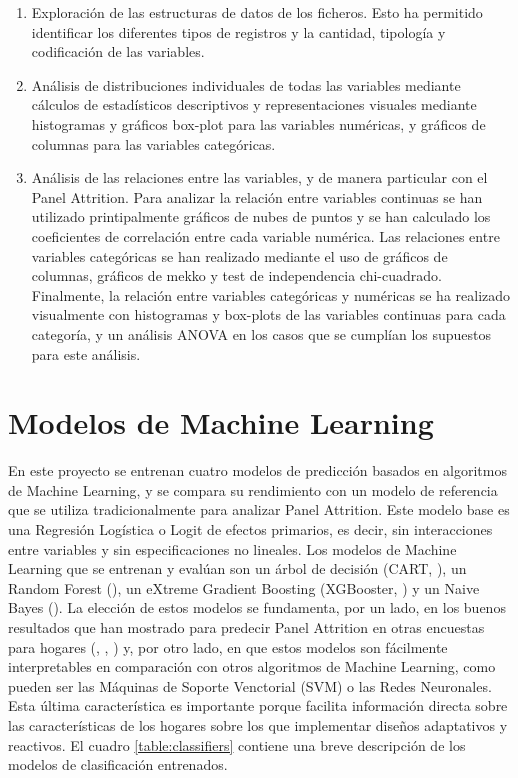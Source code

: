 \begin{enumerate}[noitemsep]
    \item Exploración de las estructuras de datos de los ficheros. Esto ha permitido identificar los diferentes tipos de registros y la cantidad, tipología y codificación de las variables.
    \item Análisis de distribuciones individuales de todas las variables mediante cálculos de estadísticos descriptivos y representaciones visuales mediante histogramas y gráficos box-plot para las variables numéricas, y gráficos de columnas para las variables categóricas.
    \item Análisis de las relaciones entre las variables, y de manera particular con el Panel Attrition. Para analizar la relación entre variables continuas se han utilizado printipalmente gráficos de nubes de puntos y se han calculado los coeficientes de correlación entre cada variable numérica. Las relaciones entre variables categóricas se han realizado mediante el uso de gráficos de columnas, gráficos de mekko y test de independencia chi-cuadrado. Finalmente, la relación entre variables categóricas y numéricas se ha realizado visualmente con histogramas y box-plots de las variables continuas para cada categoría, y un análisis ANOVA en los casos que se cumplían los supuestos para este análisis.
\end{enumerate}

\section{Modelos de Machine Learning}

En este proyecto se entrenan cuatro modelos de predicción basados en algoritmos de Machine Learning, y se compara su rendimiento con un modelo de referencia que se utiliza tradicionalmente para analizar Panel Attrition. Este modelo base es una Regresión Logística o Logit de efectos primarios, es decir, sin interacciones entre variables y sin especificaciones no lineales. Los modelos de Machine Learning que se entrenan y evalúan son un árbol de decisión (CART, \cite{breiman1984cart}), un Random Forest (\cite{breiman2001random}), un eXtreme Gradient Boosting (XGBooster, \cite{chen2016xgboost}) y un Naive Bayes (\cite{webb2010naive}). La elección de estos modelos se fundamenta, por un lado, en los buenos resultados que han mostrado para predecir Panel Attrition en otras encuestas para hogares (\cite{kern2019tree}, \cite{kern2021predicting}, \cite{beste2023case}) y, por otro lado, en que estos modelos son fácilmente interpretables en comparación con otros algoritmos de Machine Learning, como pueden ser las Máquinas de Soporte Venctorial (SVM) o las Redes Neuronales. Esta última característica es importante porque facilita información directa sobre las características de los hogares sobre los que implementar diseños adaptativos y reactivos. El cuadro \ref{table:classifiers} contiene una breve descripción de los modelos de clasificación entrenados.

